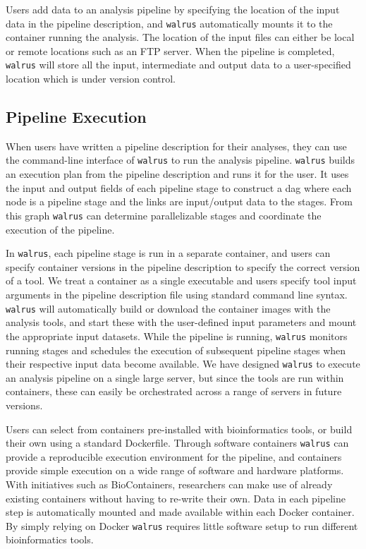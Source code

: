Users add data to an analysis pipeline by specifying the location of the
input data in the pipeline description, and \texttt{walrus} automatically mounts
it to the container running the analysis. The location of the input files can
either be local or remote locations such as an FTP server. When the pipeline is
completed, \texttt{walrus} will store all the input, intermediate and output
data to a user-specified location which is under version control.

\subsection{Pipeline Execution}
When users have written a pipeline description for their analyses, they can use
the command-line interface of \texttt{walrus} to run the analysis pipeline.
\texttt{walrus} builds an execution plan from the pipeline description and runs
it for the user. It uses the input and output fields of each pipeline stage to
construct a \gls{dag} where each node is a pipeline stage and the links are
input/output data to the stages. From this graph \texttt{walrus} can determine
parallelizable stages and coordinate the execution of the pipeline. 

In \texttt{walrus}, each pipeline stage is run in a separate container, and
users can specify container versions in the pipeline description to specify the
correct version of a tool. We treat a container as a single executable and users
specify tool input arguments in the pipeline description file using standard
command line syntax. \texttt{walrus} will automatically build or download the
container images with the analysis tools, and start these with the user-defined
input parameters and mount the appropriate input datasets. While the pipeline is
running, \texttt{walrus} monitors running stages and schedules the execution of
subsequent pipeline stages when their respective input data become available. We
have designed \texttt{walrus} to execute an analysis pipeline on a single large
server, but since the tools are run within containers, these can easily be
orchestrated across a range of servers in future versions. 

Users can select from containers pre-installed with bioinformatics tools, or build
their own using a standard Dockerfile. Through software containers
\texttt{walrus} can provide a reproducible execution environment for the
pipeline, and containers provide simple execution on a wide range of software
and hardware platforms.  With initiatives such as
BioContainers, researchers can make use of already existing
containers without having to re-write their own. Data in each pipeline step is
automatically mounted and made available within each Docker container. By simply
relying on Docker \texttt{walrus} requires little software setup to run
different bioinformatics tools. 

